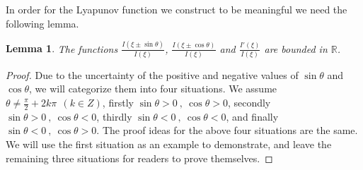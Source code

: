 \documentclass[final,3p,times]{elsarticle}
\newtheorem{lemma}{Lemma}[section]
\numberwithin{equation}{section}
\begin{document}
In order for the Lyapunov function we construct to be meaningful we need the following lemma.
\begin{lemma}\label{10}
The functions \(\displaystyle\frac{I(\xi\pm\sin\theta)}{I(\xi)}\), \(\displaystyle\frac{I(\xi\pm\cos\theta)}{I(\xi)}\) and \(\displaystyle\frac{I'(\xi)}{I(\xi)}\) are bounded in \(\mathbb{R}\).
\end{lemma}
\begin{proof}
Due to the uncertainty of the positive and negative values of  \(\sin\theta\) and \(\cos\theta\), we will categorize them into four situations. We assume  \(\theta\neq \displaystyle\frac{\pi}{2}+2k\pi~~(k\in  Z)\), firstly \(\sin\theta>0~,~\cos\theta>0\), secondly \(\sin\theta>0~,~\cos\theta<0\), thirdly \(\sin\theta<0~,~\cos\theta<0\), and finally \(\sin\theta<0~,~\cos\theta>0\). The proof ideas for the above four situations are the same. We will use the first situation as an example to demonstrate, and leave the remaining three situations for readers to prove themselves.


\end{proof}
\end{document}

